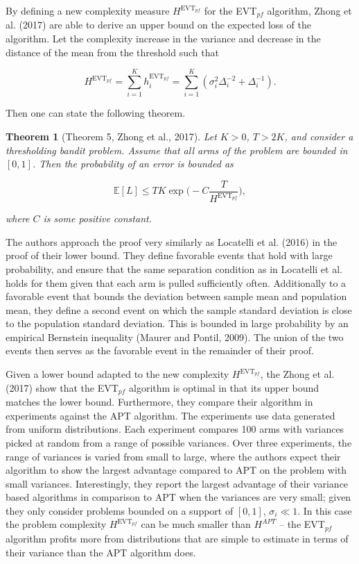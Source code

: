 \documentclass[11pt,]{article}
\newtheorem{theorem}{Theorem}
\begin{document}
By defining a new complexity measure \(H^{\text{EVT}_{pf}}\) for the
EVT\(_{pf}\) algorithm, Zhong et al. (2017) are able to derive an upper
bound on the expected loss of the algorithm. Let the complexity increase
in the variance and decrease in the distance of the mean from the
threshold such that

\[
H^{\text{EVT}_{pf}} = \sum_{i=1}^K h_i^{\text{EVT}_{pf}} = \sum_{i=1}^K (\sigma_i^2\Delta_i^{-2} + \Delta_i^{-1}).
\]

Then one can state the following theorem.

\begin{theorem}[Theorem 5, Zhong et al., 2017] 
\label{theorem:ZhongEtAl2017Theorem5}
Let $K > 0$, $T > 2K$, and consider a thresholding bandit problem. Assume that all arms of the problem are bounded in $[0,1]$. Then the probability of an error is bounded as

\begin{equation*}
\mathbb{E}[L] \leq TK \exp\Big(-C\frac{T}{H^{\text{EVT}_{pf}}}\Big),
\end{equation*}

where $C$ is some positive constant.
\end{theorem}

The authors approach the proof very similarly as Locatelli et al. (2016)
in the proof of their lower bound. They define favorable events that
hold with large probability, and ensure that the same separation
condition as in Locatelli et al. holds for them given that each arm is
pulled sufficiently often. Additionally to a favorable event that bounds
the deviation between sample mean and population mean, they define a
second event on which the sample standard deviation is close to the
population standard deviation. This is bounded in large probability by
an empirical Bernstein inequality (Maurer and Pontil, 2009). The union
of the two events then serves as the favorable event in the remainder of
their proof.

Given a lower bound adapted to the new complexity
\(H^{\text{EVT}_{pf}}\), the Zhong et al. (2017) show that the
EVT\(_{pf}\) algorithm is optimal in that its upper bound matches the
lower bound. Furthermore, they compare their algorithm in experiments
against the APT algorithm. The experiments use data generated from
uniform distributions. Each experiment compares 100 arms with variances
picked at random from a range of possible variances. Over three
experiments, the range of variances is varied from small to large, where
the authors expect their algorithm to show the largest advantage
compared to APT on the problem with small variances. Interestingly, they
report the largest advantage of their variance based algorithms in
comparison to APT when the variances are very small; given they only
consider problems bounded on a support of \([0,1]\), \(\sigma_i \ll 1\).
In this case the problem complexity \(H^{\text{EVT}_{pf}}\) can be much
smaller than \(H^{APT}\) -- the EVT\(_{pf}\) algorithm profits more from
distributions that are simple to estimate in terms of their variance
than the APT algorithm does.
\end{document}
